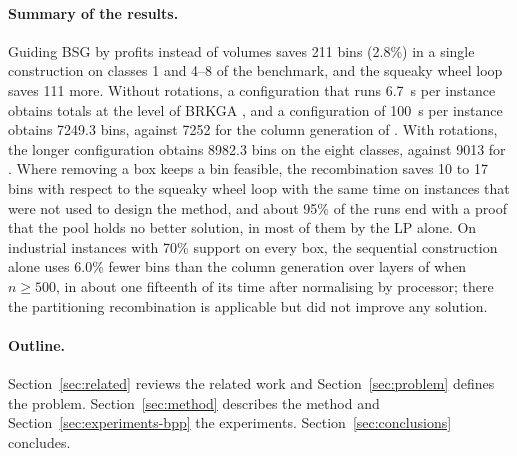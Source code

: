 \paragraph{Summary of the results.}
Guiding BSG by profits instead of volumes saves 211 bins (2.8\%) in a single construction on classes 1 and
4--8 of the benchmark, and the squeaky wheel loop saves 111 more. Without rotations, a configuration that
runs 6.7~s per instance obtains totals at the level of BRKGA \citep{Goncalves2013}, and a configuration of
100~s per instance obtains 7249.3 bins, against 7252 for the column generation of \citet{Mahvash2018}. With
rotations, the longer configuration obtains 8982.3 bins on the eight classes, against 9013 for
\citet{Mahvash2018}. Where removing a box keeps a bin feasible, the recombination saves 10 to 17 bins with
respect to the squeaky wheel loop with the same time on instances that were not used to design the method,
and about 95\% of the runs end with a proof that the pool holds no better solution, in most of them by the
LP alone. On industrial instances with 70\% support on every box, the sequential construction alone uses
6.0\% fewer bins than the column generation over layers of \citet{Elhedhli2019} when $n\ge 500$, in about
one fifteenth of its time after normalising by processor; there the partitioning recombination is
applicable but did not improve any solution.

\paragraph{Outline.}
Section~\ref{sec:related} reviews the related work and Section~\ref{sec:problem} defines the problem.
Section~\ref{sec:method} describes the method and Section~\ref{sec:experiments-bpp} the experiments.
Section~\ref{sec:conclusions} concludes.
